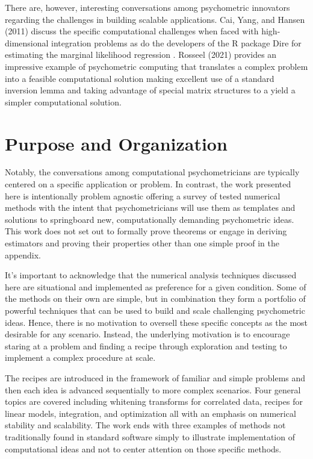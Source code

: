 \documentclass[12pt]{article}
\begin{document}
There are, however, interesting conversations among psychometric innovators regarding the challenges in building scalable applications. Cai, Yang, and Hansen (2011) discuss the specific computational challenges when faced with high-dimensional integration problems as do the developers of the R package Dire \cite{dire} for estimating the marginal likelihood regression \cite{mislevy}. Rosseel (2021) provides an impressive example of psychometric computing that translates a complex problem into a feasible computational solution making excellent use of a standard inversion lemma and taking advantage of special matrix structures to a yield a simpler computational solution. \nocite{cai} \nocite{psych3020017}

\section*{Purpose and Organization}
Notably, the conversations among computational psychometricians are typically centered on a specific application or problem. In contrast, the work presented here is intentionally problem agnostic offering a survey of tested numerical methods with the intent that psychometricians will use them as templates and solutions to springboard new, computationally demanding psychometric ideas. This work does not set out to formally prove theorems or engage in deriving estimators and proving their properties other than one simple proof in the appendix. 

It's important to acknowledge that the numerical analysis techniques discussed here are situational and implemented as preference for a given condition. Some of the methods on their own are simple, but in combination they form a portfolio of powerful techniques that can be used to build and scale challenging psychometric ideas. Hence, there is no motivation to oversell these specific concepts as the most desirable for any scenario. Instead, the underlying motivation is to encourage staring at a problem and finding a recipe through exploration and testing to implement a complex procedure at scale. 

The recipes are introduced in the framework of familiar and simple problems and then each idea is advanced sequentially to more complex scenarios. Four general topics are covered including whitening transforms for correlated data, recipes for linear models, integration, and optimization all with an emphasis on numerical stability and scalability. The work ends with three examples of methods not traditionally found in standard software simply to illustrate implementation of computational ideas and not to center attention on those specific methods. 
\end{document}
